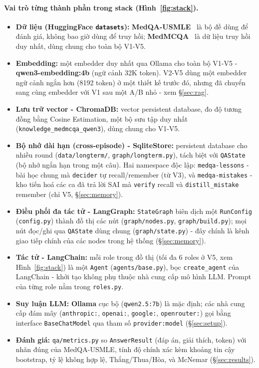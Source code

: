 \documentclass[11pt]{article}
\begin{document}
\paragraph{Vai trò từng thành phần trong stack (Hình~\ref{fig:stack}).}
\begin{itemize}[nosep]
  \item \textbf{Dữ liệu (HuggingFace \texttt{datasets}):} \textbf{MedQA-USMLE}~\cite{jin2021medqa} là bộ
  đề dùng để đánh giá, không bao giờ dùng để truy hồi; \textbf{MedMCQA}~\cite{pal2022medmcqa} là dữ
  liệu truy hồi duy nhất, dùng chung cho toàn bộ V1-V5.
  \item \textbf{Embedding:} một embedder duy nhất qua Ollama cho toàn bộ V1-V5 - \textbf{qwen3-embedding:4b}
  (ngữ cảnh 32K token). V2-V5 dùng một embedder ngữ cảnh ngắn hơn (8192 token) ở một thiết kế trước đó,
  nhưng đã chuyển sang cùng embedder với V1 sau một A/B nhỏ - xem \S\ref{sec:rag}.
  \item \textbf{Lưu trữ vector - ChromaDB:} vector persistent database, đo độ tương đồng bằng Cosine Estimation, một
  bộ sưu tập duy nhất (\texttt{knowledge\_medmcqa\_qwen3}), dùng chung cho V1-V5.
  \item \textbf{Bộ nhớ dài hạn (cross-episode) - SqliteStore:} persistent database cho nhiều round
  (\texttt{data/longterm/}, \texttt{graph/longterm.py}), tách biệt với \texttt{QAState} (bộ nhớ ngắn
  hạn trong một câu). Hai namespace độc lập: \texttt{medqa-lessons} - bài học chung mà \texttt{decider}
  tự recall/remember (từ V3), và \texttt{medqa-mistakes} - kho tiến hoá các ca đã trả lời SAI mà
  \texttt{verify} recall và \texttt{distill\_mistake} remember (chỉ V5, \S\ref{sec:memory}).
  \item \textbf{Điều phối đa tác tử - LangGraph:} \texttt{StateGraph} biên dịch một \texttt{RunConfig}
  (\texttt{config.py}) thành đồ thị các nút (\texttt{graph/nodes.py}, \texttt{graph/build.py}); mọi nút
  đọc/ghi qua \texttt{QAState} dùng chung (\texttt{graph/state.py}) - đây chính là kênh giao tiếp chính của
  các nodes trong hệ thống (\S\ref{sec:memory}).
  \item \textbf{Tác tử - LangChain:} mỗi role trong đồ thị (tối đa 6 roles ở V5, xem Hình~\ref{fig:stack})
  là một \texttt{Agent} (\texttt{agents/base.py}), bọc \texttt{create\_agent} của LangChain - khởi tạo
  không phụ thuộc nhà cung cấp mô hình LLM. Prompt của từng role nằm trong \texttt{roles.py}.
  \item \textbf{Suy luận LLM:} \textbf{Ollama} cục bộ (\texttt{qwen2.5:7b}) là mặc định;
  các nhà cung cấp đám mây (\texttt{anthropic:}, \texttt{openai:}, \texttt{google:},
  \texttt{openrouter:}) gọi bằng interface \texttt{BaseChatModel} qua tham số
  \texttt{provider:model} (\S\ref{sec:setup}).
  \item \textbf{Đánh giá:} \texttt{qa/metrics.py} so \texttt{AnswerResult} (đáp án, giải thích, token)
  với nhãn đúng của MedQA-USMLE, tính độ chính xác kèm khoảng tin cậy bootstrap, tỷ lệ không hợp lệ,
  Thắng/Thua/Hòa, và McNemar (\S\ref{sec:results}).
\end{itemize}
\end{document}
